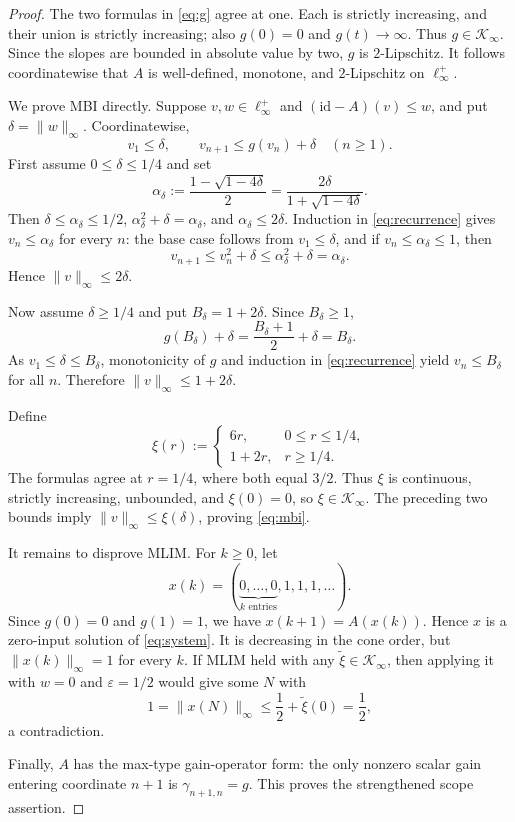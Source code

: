 \documentclass[11pt,a4paper]{article}
\newcommand{\Kinf}{\mathcal K_\infty}
\newcommand{\id}{\mathrm{id}}
\begin{document}
\begin{proof}
The two formulas in \eqref{eq:g} agree at one.  Each is strictly increasing,
and their union is strictly increasing; also $g(0)=0$ and $g(t)\to\infty$.
Thus $g\in\Kinf$.  Since the slopes are bounded in absolute value by two,
$g$ is $2$-Lipschitz.  It follows coordinatewise that $A$ is well-defined,
monotone, and $2$-Lipschitz on $\ell_\infty^+$.

We prove MBI directly.  Suppose $v,w\in\ell_\infty^+$ and
$(\id-A)(v)\leq w$, and put $\delta=\|w\|_\infty$.  Coordinatewise,
\begin{equation}\label{eq:recurrence}
 v_1\leq\delta,\qquad v_{n+1}\leq g(v_n)+\delta\quad(n\geq1).
\end{equation}
First assume $0\leq\delta\leq1/4$ and set
\[
 \alpha_\delta:=\frac{1-\sqrt{1-4\delta}}2
 =\frac{2\delta}{1+\sqrt{1-4\delta}}.
\]
Then $\delta\leq\alpha_\delta\leq1/2$,
$\alpha_\delta^2+\delta=\alpha_\delta$, and
$\alpha_\delta\leq2\delta$.  Induction in \eqref{eq:recurrence} gives
$v_n\leq\alpha_\delta$ for every $n$: the base case follows from
$v_1\leq\delta$, and if $v_n\leq\alpha_\delta\leq1$, then
\[
 v_{n+1}\leq v_n^2+\delta
 \leq\alpha_\delta^2+\delta=\alpha_\delta.
\]
Hence $\|v\|_\infty\leq2\delta$.

Now assume $\delta\geq1/4$ and put $B_\delta=1+2\delta$.  Since
$B_\delta\geq1$,
\[
 g(B_\delta)+\delta
 =\frac{B_\delta+1}{2}+\delta=B_\delta.
\]
As $v_1\leq\delta\leq B_\delta$, monotonicity of $g$ and induction in
\eqref{eq:recurrence} yield $v_n\leq B_\delta$ for all $n$.  Therefore
$\|v\|_\infty\leq1+2\delta$.

Define
\begin{equation}\label{eq:xi}
 \xi(r):=
 \begin{cases}
 6r,&0\leq r\leq1/4,\\
 1+2r,&r\geq1/4.
 \end{cases}
\end{equation}
The formulas agree at $r=1/4$, where both equal $3/2$.  Thus $\xi$ is
continuous, strictly increasing, unbounded, and $\xi(0)=0$, so
$\xi\in\Kinf$.  The preceding two bounds imply
$\|v\|_\infty\leq\xi(\delta)$, proving \eqref{eq:mbi}.

It remains to disprove MLIM.  For $k\geq0$, let
\[
 x(k)=(\underbrace{0,\ldots,0}_{k\text{ entries}},1,1,1,\ldots).
\]
Since $g(0)=0$ and $g(1)=1$, we have $x(k+1)=A(x(k))$.  Hence $x$ is a
zero-input solution of \eqref{eq:system}.  It is decreasing in the cone order,
but $\|x(k)\|_\infty=1$ for every $k$.  If MLIM held with any
$\widetilde\xi\in\Kinf$, then applying it with $w=0$ and
$\varepsilon=1/2$ would give some $N$ with
\[
 1=\|x(N)\|_\infty\leq\frac12+\widetilde\xi(0)=\frac12,
\]
a contradiction.

Finally, $A$ has the max-type gain-operator form: the only nonzero scalar gain
entering coordinate $n+1$ is $\gamma_{n+1,n}=g$.  This proves the strengthened
scope assertion.\qedhere
\end{proof}
\end{document}
